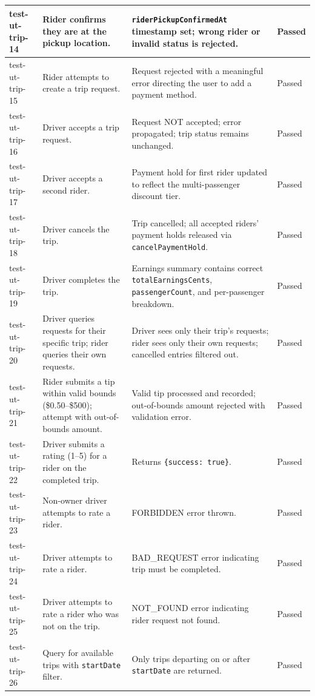 \begin{longtable}{|p{}|>{\raggedright\arraybackslash}p{}|>{\raggedright\arraybackslash}p{}|p{}|}
\hline
test-ut-trip-14 & Rider confirms they are at the pickup location. & \texttt{riderPickupConfirmedAt} timestamp set; wrong rider or invalid status is rejected. & Passed \\
\hline
test-ut-trip-15 & Rider attempts to create a trip request. & Request rejected with a meaningful error directing the user to add a payment method. & Passed \\
\hline
test-ut-trip-16 & Driver accepts a trip request. & Request NOT accepted; error propagated; trip status remains unchanged. & Passed \\
\hline
test-ut-trip-17 & Driver accepts a second rider. & Payment hold for first rider updated to reflect the multi-passenger discount tier. & Passed \\
\hline
test-ut-trip-18 & Driver cancels the trip. & Trip cancelled; all accepted riders' payment holds released via \texttt{cancelPaymentHold}. & Passed \\
\hline
test-ut-trip-19 & Driver completes the trip. & Earnings summary contains correct \texttt{totalEarningsCents}, \texttt{passengerCount}, and per-passenger breakdown. & Passed \\
\hline
test-ut-trip-20 & Driver queries requests for their specific trip; rider queries their own requests. & Driver sees only their trip's requests; rider sees only their own requests; cancelled entries filtered out. & Passed \\
\hline
test-ut-trip-21 & Rider submits a tip within valid bounds (\$0.50--\$500); attempt with out-of-bounds amount. & Valid tip processed and recorded; out-of-bounds amount rejected with validation error. & Passed \\
\hline
test-ut-trip-22 & Driver submits a rating (1--5) for a rider on the completed trip. & Returns \texttt{\{success: true\}}. & Passed \\
\hline
test-ut-trip-23 & Non-owner driver attempts to rate a rider. & FORBIDDEN error thrown. & Passed \\
\hline
test-ut-trip-24 & Driver attempts to rate a rider. & BAD\_REQUEST error indicating trip must be completed. & Passed \\
\hline
test-ut-trip-25 & Driver attempts to rate a rider who was not on the trip. & NOT\_FOUND error indicating rider request not found. & Passed \\
\hline
test-ut-trip-26 & Query for available trips with \texttt{startDate} filter. & Only trips departing on or after \texttt{startDate} are returned. & Passed \\

\end{longtable}
